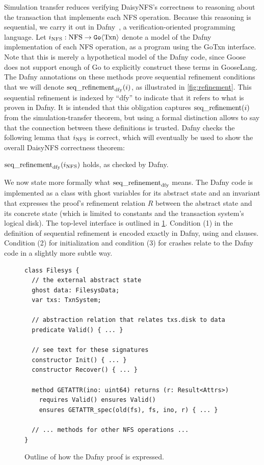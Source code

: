 \newlength{\stepw}
\newlength{\dstepw}
\newlength{\nfstop}

Simulation transfer reduces verifying DaisyNFS's correctness to reasoning about
the transaction that implements each NFS operation. Because this reasoning is
sequential, we carry it out in Dafny~\cite{leino:dafny}, a verification-oriented programming language.
Let $i_{\mathrm{NFS}} : \mathrm{NFS} \to \mathtt{Go}\langle \mathrm{Txn} \rangle$ denote a model of the
Dafny implementation of each NFS operation, as a program using the GoTxn
interface. Note that this is merely a hypothetical model of the Dafny code,
since Goose does not support enough of Go to explicitly construct these terms in
GooseLang. The Dafny annotations on these methods prove sequential refinement
conditions that we will denote $\operatorname{seq\_refinement}_{\mathrm{dfy}}(i)$, as
illustrated in \cref{fig:refinement}. This sequential refinement is indexed by
``dfy'' to indicate that it refers to what is proven in Dafny. It is intended
that this obligation captures $\operatorname{seq\_refinement}(i)$ from the simulation-transfer
theorem, but using a formal distinction allows to say that the connection
between these definitions is trusted. Dafny checks the following lemma that
$i_{\mathrm{NFS}}$ is correct, which will eventually be used to show the overall DaisyNFS
correctness theorem:
%
\nopagebreak
\begin{lemma}
  $\operatorname{seq\_refinement}_{\mathrm{dfy}}(i_{\mathrm{NFS}})$ holds, as checked by Dafny.
  \label{thm:dafny}
\end{lemma}

We now state more formally what $\operatorname{seq\_refinement}_{\mathrm{dfy}}$ means.
The Dafny code is implemented as a class with ghost variables for its abstract
state and an invariant that expresses the proof's refinement relation $R$
between the abstract state and its concrete state (which is limited to constants
and the transaction system's logical disk). The top-level interface is outlined
in \cref{fig:dafny-outline}. Condition (1) in the definition of
sequential refinement is encoded exactly in Dafny, using  and 
clauses. Condition (2) for initialization and condition (3) for crashes relate
to the Dafny code in a slightly more subtle way.

\begin{figure}
  \begin{verbatim}
class Filesys {
  // the external abstract state
  ghost data: FilesysData;
  var txs: TxnSystem;

  // abstraction relation that relates txs.disk to data
  predicate Valid() { ... }

  // see text for these signatures
  constructor Init() { ... }
  constructor Recover() { ... }

  method GETATTR(ino: uint64) returns (r: Result<Attrs>)
    requires Valid() ensures Valid()
    ensures GETATTR_spec(old(fs), fs, ino, r) { ... }

  // ... methods for other NFS operations ...
}
  \end{verbatim}
  \tightenspace
  \caption{Outline of how the Dafny proof is expressed.}
  \label{fig:dafny-outline}
\end{figure}

